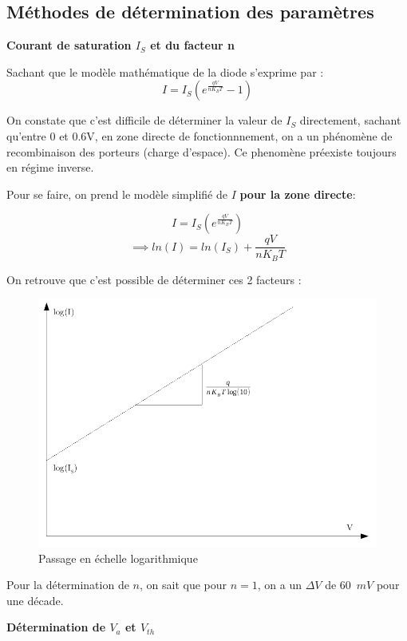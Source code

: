 \documentclass[11pt]{article}
\begin{document}
\subsection{M\'ethodes de d\'etermination des param\`etres}

\textbf{Courant de saturation $I_S$ et du facteur n}

Sachant que le mod\`ele math\'ematique de la diode s'exprime par :
\[
	I = I_S (e^{\frac{q V}{n K_B T}} - 1 )
\]

On constate que c'est difficile de d\'eterminer la valeur de $I_{S}$ directement, sachant qu'entre 0 et 0.6V, en zone directe de fonctionnnement, on a un ph\'enom\`ene de recombinaison des porteurs (charge d'espace). Ce phenom\`ene pr\'eexiste toujours en r\'egime inverse.

Pour se faire, on prend le mod\`ele simplifi\'e de $I$ \textbf{pour la zone directe}:

\[
	I = I_S (e^{\frac{q V}{n K_B T}})
\]
\[
\implies	ln(I) = ln(I_S) +  \frac{q V}{n K_B T}
\]

On retrouve que c'est possible de d\'eterminer ces 2 facteurs :

\begin{figure}[!htb]
\centering
\includegraphics[scale=0.54]{log_echelle.jpg}
\caption{Passage en \'echelle logarithmique}
\end{figure}

Pour la d\'etermination de $n$, on sait que pour $n=1$, on a un $\Delta V$ de $60 \phantom{2} mV$ pour une d\'ecade. 

\textbf{D\'etermination de $V_a$ et $V_{th}$} 
\end{document}
